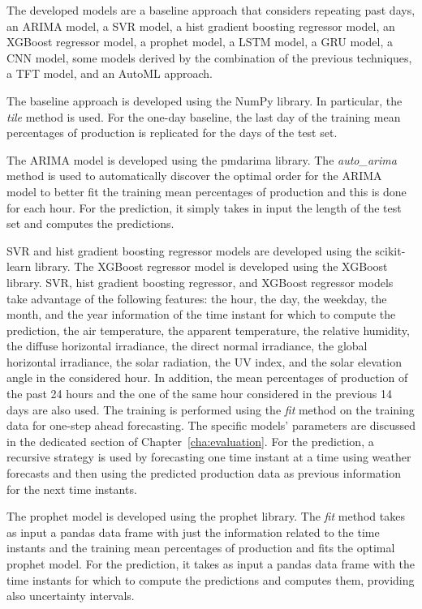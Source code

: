 The developed models are a baseline approach that considers repeating past days, an ARIMA model, a SVR model, a hist gradient boosting regressor model, an XGBoost regressor model, a prophet model, a LSTM model, a GRU model, a CNN model, some models derived by the combination of the previous techniques, a TFT model, and an AutoML approach.

The baseline approach is developed using the NumPy library.
In particular, the \emph{tile} method is used.
For the one-day baseline, the last day of the training mean percentages of production is replicated for the days of the test set.

The ARIMA model is developed using the pmdarima library.
The \emph{auto\_arima} method is used to automatically discover the optimal order for the ARIMA model to better fit the training mean percentages of production and this is done for each hour.
For the prediction, it simply takes in input the length of the test set and computes the predictions.

SVR and hist gradient boosting regressor models are developed using the scikit-learn library.
The XGBoost regressor model is developed using the XGBoost library.
SVR, hist gradient boosting regressor, and XGBoost regressor models take advantage of the following features: the hour, the day, the weekday, the month, and the year information of the time instant for which to compute the prediction, the air temperature, the apparent temperature, the relative humidity, the diffuse horizontal irradiance, the direct normal irradiance, the global horizontal irradiance, the solar radiation, the UV index, and the solar elevation angle in the considered hour.
In addition, the mean percentages of production of the past 24 hours and the one of the same hour considered in the previous 14 days are also used.
The training is performed using the \emph{fit} method on the training data for one-step ahead forecasting.
The specific models' parameters are discussed in the dedicated section of Chapter~\ref{cha:evaluation}.
For the prediction, a recursive strategy is used by forecasting one time instant at a time using weather forecasts and then using the predicted production data as previous information for the next time instants.

The prophet model is developed using the prophet library.
The \emph{fit} method takes as input a pandas data frame with just the information related to the time instants and the training mean percentages of production and fits the optimal prophet model.
For the prediction, it takes as input a pandas data frame with the time instants for which to compute the predictions and computes them, providing also uncertainty intervals.

